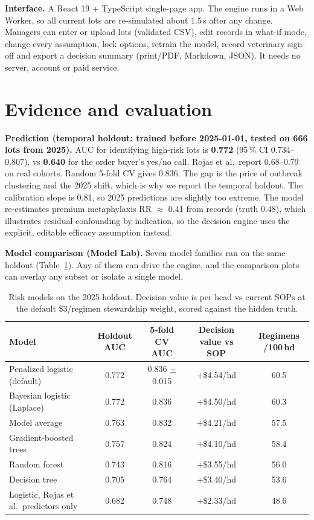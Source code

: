\documentclass[10pt,letterpaper]{article}
\newcommand{\pct}{\,\%}
\newcommand{\usd}[1]{\$#1}
\newcommand{\lead}[1]{\textbf{#1}\enspace}
\begin{document}
\lead{Interface.} A React 19 + TypeScript single-page app. The engine runs in a Web Worker, so all current lots are re-simulated about 1.5\,s after any change. Managers can enter or upload lots (validated CSV), edit records in what-if mode, change every assumption, lock options, retrain the model, record veterinary sign-off and export a decision summary (print/PDF, Markdown, JSON). It needs no server, account or paid service.

\section{Evidence and evaluation}

\lead{Prediction (temporal holdout: trained before 2025-01-01, tested on 666 lots from 2025).} AUC for identifying high-risk lots is \textbf{0.772} (95\pct{} CI 0.734--0.807), vs \textbf{0.640} for the order buyer's yes/no call. Rojas et al.\ report 0.68--0.79 on real cohorts. Random 5-fold CV gives 0.836. The gap is the price of outbreak clustering and the 2025 shift, which is why we report the temporal holdout. The calibration slope is 0.81, so 2025 predictions are slightly too extreme. The model re-estimates premium metaphylaxis RR $\approx$ 0.41 from records (truth 0.48), which illustrates residual confounding by indication, so the decision engine uses the explicit, editable efficacy assumption instead.

\lead{Model comparison (Model Lab).} Seven model families ran on the same holdout (Table~\ref{tab:models}). Any of them can drive the engine, and the comparison plots can overlay any subset or isolate a single model.

\begin{table}[h]
\centering\small
\caption{Risk models on the 2025 holdout. Decision value is per head vs current SOPs at the default \usd{3}/regimen stewardship weight, scored against the hidden truth.}\label{tab:models}
\begin{tabular}{@{}lcccc@{}}
\toprule
\textbf{Model} & \textbf{Holdout AUC} & \textbf{5-fold CV AUC} & \textbf{Decision value vs SOP} & \textbf{Regimens /100\,hd} \\
\midrule
Penalized logistic (default) & 0.772 & 0.836 $\pm$ 0.015 & +\usd{4.54}/hd & 60.5 \\
Bayesian logistic (Laplace) & 0.772 & 0.836 & +\usd{4.50}/hd & 60.3 \\
Model average & 0.763 & 0.832 & +\usd{4.21}/hd & 57.5 \\
Gradient-boosted trees & 0.757 & 0.824 & +\usd{4.10}/hd & 58.4 \\
Random forest & 0.743 & 0.816 & +\usd{3.55}/hd & 56.0 \\
Decision tree & 0.705 & 0.764 & +\usd{3.40}/hd & 53.6 \\
Logistic, Rojas et al.\ predictors only & 0.682 & 0.748 & +\usd{2.33}/hd & 48.6 \\
\bottomrule
\end{tabular}
\end{table}
\end{document}

